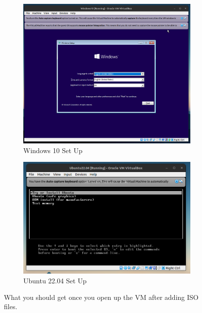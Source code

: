   \begin{figure}[hbt!]
      \centering 
      \begin{subfigure}[b]{0.45\textwidth}
      \centering
          \includegraphics[width=\textwidth]{img/VM_Windows1.png}
          \caption{Windows 10 Set Up}
          \label{fig:VM_Windows1}
      \end{subfigure}
      \hfill 
      \begin{subfigure}[b]{0.45\textwidth}
      \centering
          \includegraphics[width=\textwidth]{img/VM_Ubuntu1.png}
          \caption{Ubuntu 22.04 Set Up}
          \label{fig:VM_Ubuntu1}
      \end{subfigure}
      \caption{What you should get once you open up the VM after adding ISO files. }
  \end{figure}
